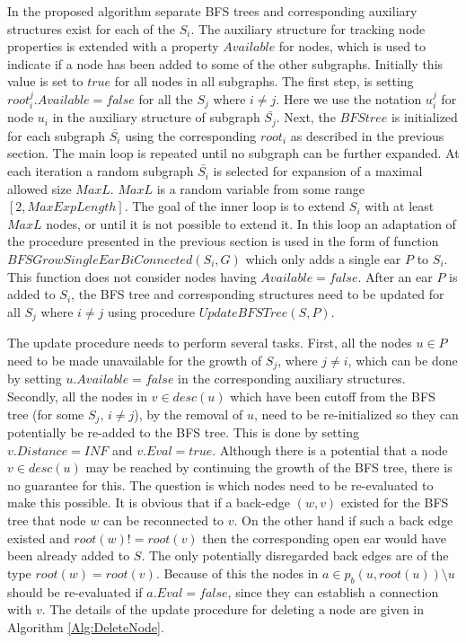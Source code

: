 In the proposed algorithm  separate BFS trees and corresponding auxiliary structures exist for each of the $S_i$. The auxiliary structure for tracking node properties is extended with a property $Available$ for nodes, which is used to indicate if a node has been added to some of the other subgraphs. Initially this value is set to $true$ for all nodes in all subgraphs. The first step, is setting $root^j_i.Available = false$ for all the $S_j$ where $i \neq j$. Here we use the notation $u^j_i$ for node $u_i$ in the auxiliary structure of subgraph $\bar{S_j}$. Next, the $BFStree$ is initialized for each subgraph $\bar{S_i}$ using the corresponding $root_i$ as described in the previous section. The main loop is repeated until no subgraph can be further expanded. At each iteration a random subgraph $\bar{S_i}$ is selected for expansion of a maximal allowed size $MaxL$. $MaxL$ is a random variable from some range $[2,MaxExpLength]$. The goal of the inner loop is to extend $S_i$ with at least $MaxL$ nodes, or until it is not possible to extend it. In this loop an adaptation of the procedure presented in the previous section  is used in the form of function $BFSGrowSingleEarBiConnected(S_i,G)$ which only adds a single ear $P$ to $S_i$. This function does not consider nodes having $Available = false$. After an ear $P$ is added to $S_i$, the  BFS tree and corresponding structures need to be updated for all $S_j$ where $i \neq j$ using procedure $UpdateBFSTree(S,P)$. 

The update procedure needs to perform several tasks. First, all the nodes $u \in P$ need to be made unavailable for the growth of $S_j$, where $j \neq i$, which can be done by setting $u.Available = false$ in the corresponding auxiliary structures. Secondly, all the nodes in $v \in desc(u)$ which have been cutoff from the BFS tree (for some $S_j$, $i \neq j$), by the removal of $u$, need to be re-initialized so they can potentially be re-added to the BFS tree. This is done by setting $v.Distance = INF$ and $v.Eval = true$. Although there is a potential that a node $v \in desc(u)$  may be reached by continuing the growth of the BFS tree, there is no guarantee for this.  The question is which nodes need to be re-evaluated to make this possible. It is obvious that if a back-edge  $(w, v)$ existed for the BFS tree that node $w$ can be reconnected to $v$. On the other hand if such a back edge existed and $root(w) != root(v)$ then the corresponding open ear would have been already added to $S$. The only potentially disregarded back edges  are of the type $root(w) = root(v)$.  Because of this  the nodes in $a \in p_b(u,root(u)) \setminus u$  should be re-evaluated if  $a.Eval = false$, since they can  establish a connection with $v$. The details of the update procedure for deleting a node are given in Algorithm \ref{Alg:DeleteNode}.

